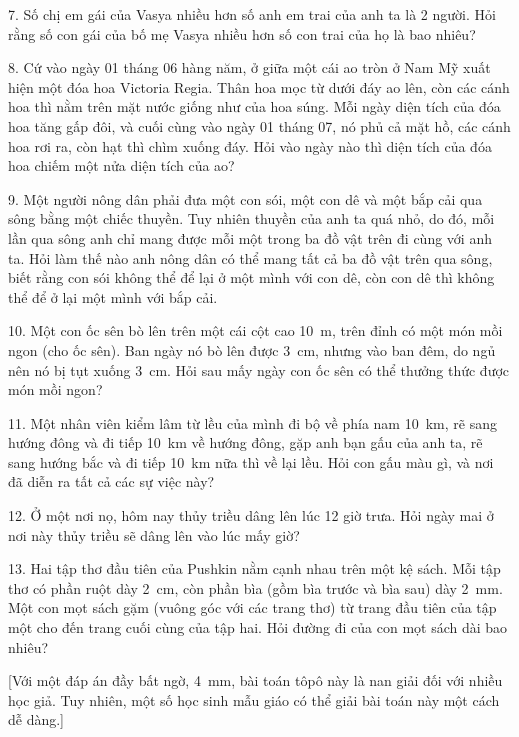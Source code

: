 \begin{problem}{7.}
	Số chị em gái của Vasya nhiều hơn số anh em trai của anh ta là 2 người. Hỏi rằng số con gái của bố mẹ Vasya nhiều hơn số con trai của họ là bao nhiêu?
\end{problem}

\begin{problem}{8.}
	Cứ vào ngày 01 tháng 06 hàng năm, ở giữa một cái ao tròn ở Nam Mỹ xuất hiện một đóa hoa Victoria Regia. Thân hoa mọc từ dưới đáy ao lên, còn các cánh hoa thì nằm trên mặt nước giống như của hoa súng. Mỗi ngày diện tích của đóa hoa tăng gấp đôi, và cuối cùng vào ngày 01 tháng 07, nó phủ cả mặt hồ, các cánh hoa rơi ra, còn hạt thì chìm xuống đáy. Hỏi vào ngày nào thì diện tích của đóa hoa chiếm một nửa diện tích của ao?
\end{problem}

\begin{problem}{9.}
	Một người nông dân phải đưa một con sói, một con dê và một bắp cải qua sông bằng một chiếc thuyền. Tuy nhiên thuyền của anh ta quá nhỏ, do đó, mỗi lần qua sông anh chỉ mang được mỗi một trong ba đồ vật trên đi cùng với anh ta. Hỏi làm thế nào anh nông dân có thể mang tất cả ba đồ vật trên qua sông, biết rằng con sói không thể để lại ở một mình với con dê, còn con dê thì không thể để ở lại một mình với bắp cải.
\end{problem}

\begin{problem}{10.}
	Một con ốc sên bò lên trên một cái cột cao \SI{10}{\metre}, trên đỉnh có một món mồi ngon (cho ốc sên). Ban ngày nó bò lên được \SI{3}{\cm}, nhưng vào ban đêm, do ngủ nên nó bị tụt xuống \SI{3}{\cm}. Hỏi sau mấy ngày con ốc sên có thể thưởng thức được món mồi ngon?
\end{problem}

\begin{problem}{11.}
	Một nhân viên kiểm lâm từ lều của mình đi bộ về phía nam \SI{10}{\km}, rẽ sang hướng đông và đi tiếp \SI{10}{\km} về hướng đông, gặp anh bạn gấu của anh ta, rẽ sang hướng bắc và đi tiếp \SI{10}{\km} nữa thì về lại lều. Hỏi con gấu màu gì, và nơi đã diễn ra tất cả các sự việc này?
\end{problem}

\begin{problem}{12.}
	Ở một nơi nọ, hôm nay thủy triều dâng lên lúc 12 giờ trưa. Hỏi ngày mai ở nơi này thủy triều sẽ dâng lên vào lúc mấy giờ?
\end{problem}

\begin{problem}{13.}
	Hai tập thơ đầu tiên của Pushkin nằm cạnh nhau trên một kệ sách. Mỗi tập thơ có phần ruột dày \SI{2}{\cm}, còn phần bìa (gồm bìa trước và bìa sau) dày \SI{2}{\mm}. Một con mọt sách gặm (vuông góc với các trang thơ) từ trang đầu tiên của tập một cho đến trang cuối cùng của tập hai. Hỏi đường đi của con mọt sách dài bao nhiêu?

	[Với một đáp án đầy bất ngờ, \SI{4}{\mm}, bài toán tôpô này là nan giải đối với nhiều học giả. Tuy nhiên, một số học sinh mẫu giáo có thể giải bài toán này một cách dễ dàng.]
\end{problem}

